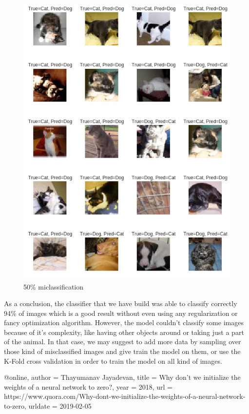 \documentclass[a4paper]{article}
\begin{document}
\begin{itemize}
\begin{figure}[h!]
	\centering
	\includegraphics[scale=.4]{50misclass.png}
	\caption{50\% miclassification}
		\label{fig:50misclass}
	\end{figure}


\end{itemize}

As a conclusion, the classifier that we have build was able to classify correctly 94\% of images which is a good result without even using any regularization or fancy optimization algorithm. However, the model couldn't classify some images because of it's complexity, like having other objects around or taking just a part of the animal. In that case, we may suggest to add more data by sampling over those kind of misclassified images and give train the model on them, or use the K-Fold cross validation in order to train the model on all kind of images.
 
 \newpage
\begin{thebibliography}
@online{,
  author = {Thayumanav Jayadevan},
  title = {Why don't we initialize the weights of a neural network to zero?},
  year = 2018,
  url = {https://www.quora.com/Why-dont-we-initialize-the-weights-of-a-neural-network-to-zero},
  urldate = {2019-02-05}
}
\end{thebibliography}
\end{document}
